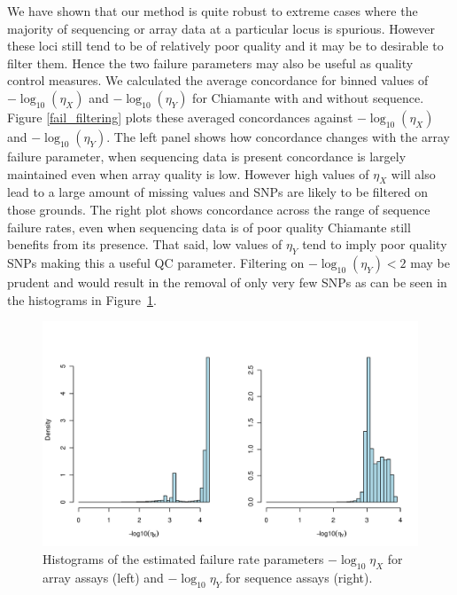 We have shown that our method is quite robust to extreme cases where the majority of sequencing or array data at a particular locus is spurious.  However these loci still tend to be of relatively poor quality and it may be to desirable to filter them.  Hence the two failure parameters may also be useful as quality control measures.  We calculated the average concordance for binned values of $-\log_{10}(\eta_X)$ and $-\log_{10}(\eta_Y)$ for Chiamante with and without sequence.   Figure \ref{fail_filtering} plots these averaged concordances against $-\log_{10}(\eta_X)$ and $-\log_{10}(\eta_Y)$.  The left panel shows how concordance changes with the array failure parameter, when sequencing data is present concordance is largely maintained even when array quality is low. However high values of $\eta_X$ will also lead to a large amount of missing values and SNPs are likely to be filtered on those grounds. The right plot shows concordance across the range of sequence failure rates, even when sequencing data is of poor quality Chiamante still benefits from its presence.  That said, low values of $\eta_Y$ tend to imply poor quality SNPs making this a useful QC parameter.  Filtering on $-\log_{10}(\eta_Y) <  2$ may be prudent and would result in the removal of only very few SNPs as can be seen in the histograms in Figure~\ref{chap2:results:eta_hist}.

\begin{figure}[p]
  \begin{center} 
    \includegraphics[width=\textwidth]{chap2figs/SupFig9}
    \caption[Histograms of the estimated failure rate parameters]{Histograms of the estimated failure rate parameters $-\log_{10} \eta_X$ for array assays (left) and $-\log_{10} \eta_Y$ for sequence assays (right).\label{chap2:results:eta_hist} }
  \end{center} 
\end{figure}


